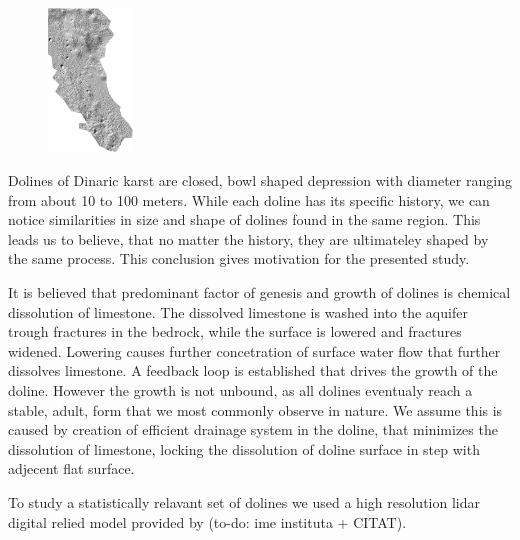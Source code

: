 \documentclass[a0,portrait]{a0poster}
\begin{document}
\begin{multicols}{2}
\begin{figure}
\begin{center}
	\includegraphics[width=0.2\textwidth]{menisija-relief.png}
	\label{fig:menisija}
\end{center}
\end{figure}

Dolines of Dinaric karst are closed, bowl shaped depression with diameter ranging from about 10 to 100 meters. While each doline has its specific history, we can notice similarities in size and shape of dolines found in the same region. This leads us to believe, that no matter the history, they are ultimateley shaped by the same process. This conclusion gives motivation for the presented study.

It is believed that predominant factor of genesis and growth of dolines is chemical dissolution of limestone. The dissolved limestone is washed into the aquifer trough fractures in the bedrock, while the surface is lowered and fractures widened. Lowering causes further concetration of surface water flow that further dissolves limestone. A feedback loop is established that drives the growth of the doline. However the growth is not unbound, as all dolines eventualy reach a stable, adult, form that we most commonly observe in nature. We assume this is caused by creation of efficient drainage system in the doline, that minimizes the dissolution of limestone, locking the dissolution of doline surface in step with adjecent flat surface.

To study a statistically relavant set of dolines we used a high resolution lidar digital relied model provided by (to-do: ime instituta + CITAT).


\color{DarkSlateGray} %


\end{multicols}
\end{document}
